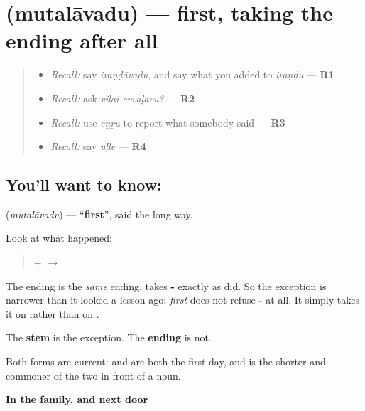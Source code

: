 \section[\texorpdfstring{\ta{முதலாவது} (mutalāvadu)}{முதலாவது (mutalāvadu)}]{ (mutalāvadu) — first, taking the ending after all}

\label{lesson:TA-C82-first-full}



\begin{quote}
\begin{itemize}
\raggedright
  \item \emph{Recall:} say \emph{iraṇḍāvadu}, and say what you added to \emph{iraṇḍu} — \textbf{R1}
  \item \emph{Recall:} ask \emph{vilai evvaḷavu?} — \textbf{R2}
  \item \emph{Recall:} use \emph{eṉṟu} to report what somebody said — \textbf{R3}
  \item \emph{Recall:} say \emph{uḷḷē} — \textbf{R4}
\end{itemize}
\end{quote}

\subsection*{You'll want to know: }
\textbf{} (\emph{mutalāvadu}) — \textquotedblleft{}\textbf{first}\textquotedblright{}, said the long way.

Look at what happened:

\begin{quote}
\textbf{} + \textbf{} $\to$ \textbf{}
\end{quote}

The ending is the \emph{same} ending. \textbf{} takes \textbf{-} exactly as \textbf{} did. So the exception is narrower than it looked a lesson ago: \emph{first} does not refuse \textbf{-} at all. It simply takes it on \textbf{} rather than on \textbf{}.

The \textbf{stem} is the exception. The \textbf{ending} is not.

Both forms are current: \textbf{ } and \textbf{ } are both the first day, and \textbf{} is the shorter and commoner of the two in front of a noun.

\textbf{In the family, and next door}

